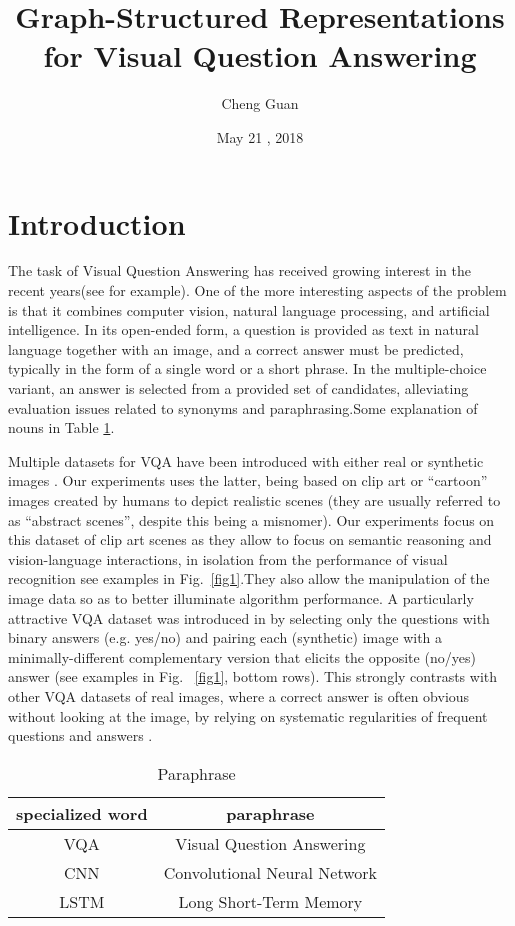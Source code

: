 \documentclass[a4paper,twocolumn]{article}
\title{Graph-Structured Representations for Visual Question Answering}
\author{Cheng Guan}
\date{May 21 , 2018}
\begin{document}
\maketitle

\section{Introduction}
The task of Visual Question Answering has received
growing interest in the recent years(see \cite{c1,c2}for example).
One of the more interesting aspects of the problem
is that it combines computer vision, natural language processing,
and artificial intelligence. In its open-ended form,
a question is provided as text in natural language together
with an image, and a correct answer must be predicted, typically
in the form of a single word or a short phrase. In the
multiple-choice variant, an answer is selected from a provided
set of candidates, alleviating evaluation issues related
to synonyms and paraphrasing.Some explanation of nouns in Table \ref{tb1}.

Multiple datasets for VQA have been introduced with
either real \cite{c1} or synthetic images \cite{c1,c3}.
Our experiments uses the latter, being based on clip art
or “cartoon” images created by humans to depict realistic
scenes (they are usually referred to as “abstract scenes”, despite
this being a misnomer). Our experiments focus on
this dataset of clip art scenes as they allow to focus on semantic
reasoning and vision-language interactions, in isolation
from the performance of visual recognition see examples
in Fig.~\ref{fig1}.They also allow the manipulation of
the image data so as to better illuminate algorithm performance.
A particularly attractive VQA dataset was introduced
in \cite{c3} by selecting only the questions with binary answers
(e.g. yes/no) and pairing each (synthetic) image with
a minimally-different complementary version that elicits the
opposite (no/yes) answer (see examples in Fig. ~\ref{fig1}, bottom
rows). This strongly contrasts with other VQA datasets of
real images, where a correct answer is often obvious without
looking at the image, by relying on systematic regularities
of frequent questions and answers \cite{c1,c3}.

\begin{table}[htbp]
\label{tb1}
\caption{Paraphrase}
\begin{tabular}{|c|c|}
\hline
specialized word & paraphrase\\
\hline
VQA & Visual Question Answering\\
CNN & Convolutional Neural Network\\
LSTM & Long Short-Term Memory\\
\hline
\end{tabular}
\end{table}
\end{document}
